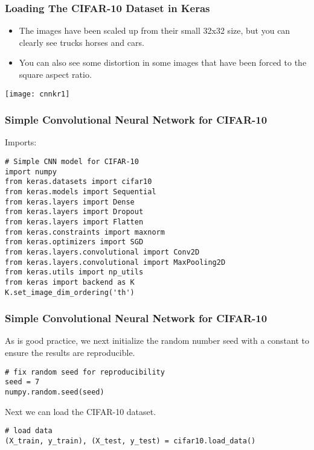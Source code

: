 \begin{frame}[fragile] \frametitle{Loading The CIFAR-10 Dataset in Keras}
\begin{itemize}
\item The images have been scaled up from their small 32x32 size, but you can clearly see trucks horses and cars.
\item You can also see some distortion in some images that have been forced to the square aspect ratio.
\end{itemize}
\begin{center}
\texttt{[image: cnnkr1]}
\end{center}
\end{frame}



\begin{frame}[fragile] \frametitle{Simple Convolutional Neural Network for CIFAR-10}
Imports:
\begin{lstlisting}
# Simple CNN model for CIFAR-10
import numpy
from keras.datasets import cifar10
from keras.models import Sequential
from keras.layers import Dense
from keras.layers import Dropout
from keras.layers import Flatten
from keras.constraints import maxnorm
from keras.optimizers import SGD
from keras.layers.convolutional import Conv2D
from keras.layers.convolutional import MaxPooling2D
from keras.utils import np_utils
from keras import backend as K
K.set_image_dim_ordering('th')
\end{lstlisting}

\end{frame}

\begin{frame}[fragile] \frametitle{Simple Convolutional Neural Network for CIFAR-10}
As is good practice, we next initialize the random number seed with a constant to ensure the results are reproducible.
\begin{lstlisting}
# fix random seed for reproducibility
seed = 7
numpy.random.seed(seed)
\end{lstlisting}
Next we can load the CIFAR-10 dataset.
\begin{lstlisting}
# load data
(X_train, y_train), (X_test, y_test) = cifar10.load_data()
\end{lstlisting}
\end{frame}

